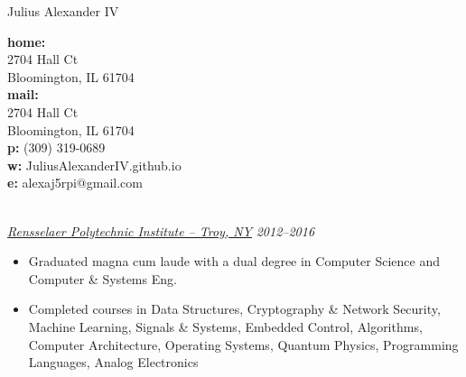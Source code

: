 \documentclass[11pt]{article} %
\begin{document}
\title{}
\centerline{ {\Huge \sc Julius Alexander IV} }

\begin{multicols}{3}
\noindent \textbf{home:} \\
2704 Hall Ct \\
Bloomington, IL 61704 \\

\noindent \textbf{mail:} \\
2704 Hall Ct \\
Bloomington, IL 61704 \\

\noindent \textbf{p:} (309) 319-0689 \\
\noindent \textbf{w:} JuliusAlexanderIV.github.io \\
\noindent \textbf{e:} alexaj5rpi@gmail.com
\end{multicols}


 \hrulefill\\
\noindent
\underline{\textit{Rensselaer Polytechnic Institute -- Troy, NY}} \hfill \textit{2012--2016}

\begin{itemize}[noitemsep]
\renewcommand\labelitemi{$\circ$}

\item Graduated magna cum laude with a dual degree in Computer Science and Computer \& Systems Eng.
\item Completed courses in Data Structures, Cryptography \& Network Security, Machine Learning, Signals \& Systems, Embedded Control, Algorithms, Computer Architecture, Operating Systems, Quantum Physics, Programming Languages, Analog Electronics
\end{itemize}

\end{document}
